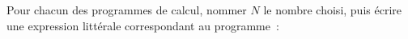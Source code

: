 \documentclass[exercice]{thedocument}%
\begin{document}
%
Pour chacun des programmes de calcul, nommer $N$ le nombre choisi, puis
écrire une expression littérale correspondant au programme~:\vskip10pt
{\centering
{}
}\par
\end{document}
